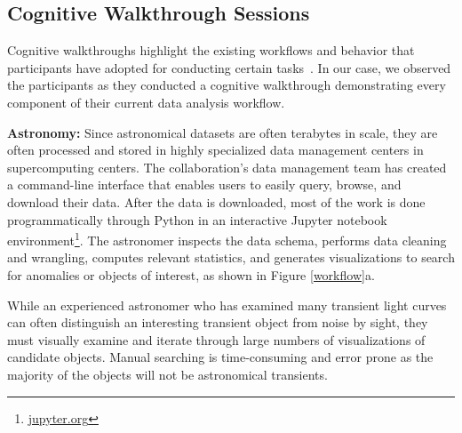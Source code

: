 \subsection{Cognitive Walkthrough Sessions}
Cognitive walkthroughs highlight the existing workflows and behavior that participants have adopted for conducting certain tasks~\cite{Nielsen1994}. In our case, we observed the participants as they conducted a cognitive walkthrough demonstrating every component of their current data analysis workflow.
\par \textbf{Astronomy:} Since astronomical datasets are often terabytes in scale, they are often processed and stored in highly specialized data management centers in supercomputing centers. The collaboration's data management team has created a command-line interface that enables users to easily query, browse, and download their data. 
After the data is downloaded, most of the work is done programmatically through Python in an interactive Jupyter notebook environment\footnote{\url{jupyter.org}}. The astronomer inspects the data schema, performs data cleaning and  wrangling, computes relevant statistics, and generates visualizations to search for anomalies or objects of interest, as shown in Figure \ref{workflow}a.
\par While an experienced astronomer who has examined many transient light curves can often distinguish an interesting transient object from noise by sight, they must visually examine and iterate through large numbers of visualizations of candidate objects. Manual searching is time-consuming and error prone as the majority of the objects will not be astronomical transients.
